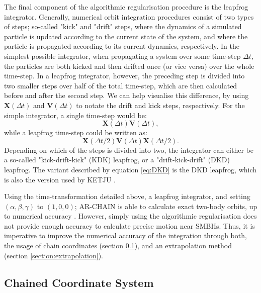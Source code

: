 \documentclass[english, twoside]{HYgradu}
\begin{document}
The final component of the algorithmic regularisation procedure is the leapfrog integrator. Generally, numerical orbit integration procedures consist of two types of steps; so-called "kick" and "drift" steps, where the dynamics of a simulated particle is updated according to the current state of the system, and where the particle is propagated according to its current dynamics, respectively. In the simplest possible integrator, when propagating a system over some time-step $\Delta t$, the particles are both kicked and then drifted once (or vice versa) over the whole time-step. In a leapfrog integrator, however, the preceding step is divided into two smaller steps over half of the total time-step, which are then calculated before and after the second step. We can help visualise this difference, by using $\mathbf{X}(\Delta t)$ and $\mathbf{V}(\Delta t)$ to notate the drift and kick steps, respectively. For the simple integrator, a single time-step would be:
\begin{equation}
\mathbf{X}(\Delta t)\mathbf{V}(\Delta t),
\end{equation} 
while a leapfrog time-step could be written as:
\begin{equation}
\mathbf{X}(\Delta t/2)\mathbf{V}(\Delta t)\mathbf{X}(\Delta t/2). \label{eq:DKD}
\end{equation}
Depending on which of the steps is divided into two, the integrator can either be a so-called "kick-drift-kick" (KDK) leapfrog, or a "drift-kick-drift" (DKD) leapfrog. The variant described by equation \ref{eq:DKD} is the DKD leapfrog, which is also the version used by KETJU \citep{Rantala2017KETJU}.

Using the time-transformation detailed above, a leapfrog integrator, and setting $(\alpha, \beta, \gamma)$ to $(1, 0, 0)$; AR-CHAIN is able to calculate exact two-body orbits, up to numerical accuracy \citep{Mikkola2008ARCHAIN}. However, simply using the algorithmic regularisation does not provide enough accuracy to calculate precise motion near SMBHs. Thus, it is imperative to improve the numerical accuracy of the integration through both, the usage of chain coordinates (section \ref{section:chained_coordiantes}), and an extrapolation method (section \ref{section:extrapolation}).

\subsection{Chained Coordinate System} \label{section:chained_coordiantes}
\end{document}
